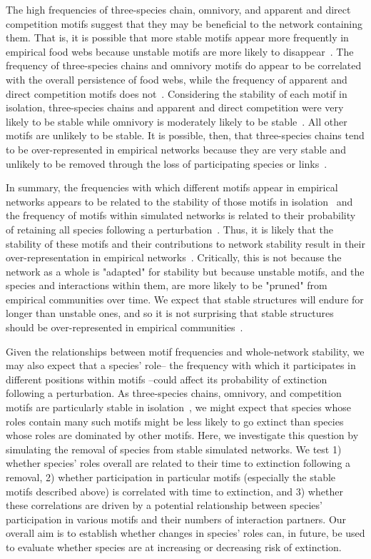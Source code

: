 \documentclass[12pt]{article}
\begin{document}
	The high frequencies of three-species chain, omnivory, and apparent and direct competition motifs suggest that they may be beneficial to the network containing them. That is, it is possible that more stable motifs appear more frequently in empirical food webs because unstable motifs are more likely to disappear~\citep{Borrelli2015,Borrelli2015a}. The frequency of three-species chains and omnivory motifs do appear to be correlated with the overall persistence of  food webs, while the frequency of apparent and direct competition motifs does not~\citep{Stouffer2010}. Considering the stability of each motif in isolation, three-species chains and apparent and direct competition were very likely to be stable while omnivory is moderately likely to be stable~\citep{Borrelli2015a}. All other motifs are unlikely to be stable. It is possible, then, that three-species chains tend to be over-represented in empirical networks because they are very stable and unlikely to be removed through the loss of participating species or links~\citep{Borrelli2015}.  


	In summary, the frequencies with which different motifs appear in empirical networks appears to be related to the stability of those motifs in isolation~\citep{Stouffer2010b,Borrelli2015a} and the frequency of motifs within simulated networks is related to their probability of retaining all species following a perturbation~\citep{Stouffer2010b}. Thus, it is likely that the stability of these motifs and their contributions to network stability result in their over-representation in empirical networks~\citep{Borrelli2015}. Critically, this is not because the network as a whole is "adapted" for stability but because unstable motifs, and the species and interactions within them, are more likely to be "pruned" from empirical communities over time. We expect that stable structures will endure for longer than unstable ones, and so it is not surprising that stable structures should be over-represented in empirical communities~\citep{Borrelli2015}.


	Given the relationships between motif frequencies and whole-network stability, we may also expect that a species' role-- the frequency with which it participates in different positions within motifs --could affect its probability of extinction following a perturbation. As three-species chains, omnivory, and competition motifs are particularly stable in isolation~\citep{Borrelli2015a}, we might expect that species whose roles contain many such motifs might be less likely to go extinct than species whose roles are dominated by other motifs. Here, we investigate this question by simulating the removal of species from stable simulated networks. We test 1) whether species' roles overall are related to their time to extinction following a removal, 2) whether participation in particular motifs (especially the stable motifs described above) is correlated with time to extinction, and 3) whether these correlations are driven by a potential relationship between species' participation in various motifs and their numbers of interaction partners. Our overall aim is to establish whether changes in species' roles can, in future, be used to evaluate whether species are at increasing or decreasing risk of extinction.
\end{document}
